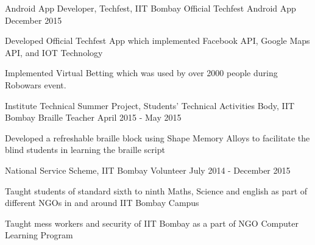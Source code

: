 


\begin{cventries}
	\cventry
		{Android App Developer, Techfest, IIT Bombay}
		{Official Techfest Android App}
		{}
		{December 2015}
		{
		\begin{cvitems}
			\item Developed Official Techfest App which implemented Facebook API, Google Maps API, and IOT Technology
			\item Implemented Virtual Betting which was used by over 2000 people during Robowars event.  
		\end{cvitems}
		}

	\cventry
		{Institute Technical Summer Project, Students' Technical Activities Body, IIT Bombay}
		{Braille Teacher}
		{}
		{April 2015 - May 2015}
		{
		\begin{cvitems}
			\item Developed a refreshable braille block using Shape Memory Alloys to facilitate the blind students in learning the braille script 
		\end{cvitems}
		}
\end{cventries}

\begin{cventries}

	\cventry
		{National Service Scheme, IIT Bombay} %
		{Volunteer} %
		{} %
		{July 2014 - December 2015} %
		{
		  \begin{cvitems} %
		    \item Taught students of standard sixth to ninth Maths, Science and english as part of different NGOs in and around IIT Bombay Campus
		    \item Taught mess workers and security of IIT Bombay as a part of NGO Computer Learning Program
		  \end{cvitems}
		}

  
\end{cventries}

